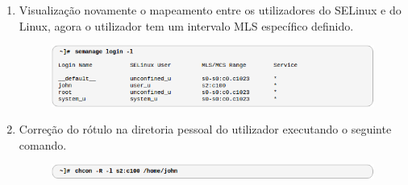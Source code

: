 \documentclass[../tp2.tex]{subfiles}
\begin{document}
\begin{enumerate}
\item Visualização novamente o mapeamento entre os utilizadores do SELinux e do Linux, agora o utilizador tem um intervalo MLS específico definido.\par 
\begin{figure}[H]
\centering
\captionsetup{justification=centering,margin=2cm}
\centerline{\includegraphics[scale=0.7]{../imagens/definido.png}}
\end{figure}

\item Correção do rótulo na diretoria pessoal do utilizador executando o seguinte comando.\par
\begin{figure}[H]
\centering
\captionsetup{justification=centering,margin=2cm}
\centerline{\includegraphics[scale=0.7]{../imagens/rotulouser.png}}
\end{figure}
\end{enumerate}
\end{document}
